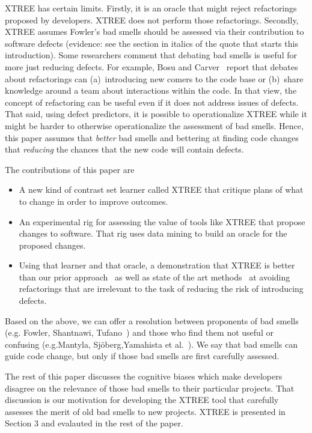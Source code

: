 \documentclass{sig-alternate}
\begin{document}
XTREE   has certain limits. Firstly, it is an oracle that  might reject   refactorings proposed
by developers. XTREE does not perform those refactorings.
Secondly, XTREE assumes   Fowler's bad smells
should be assessed via their contribution to software defects
(evidence: see the section in italics of the quote
that starts this introduction). Some researchers 
 comment that   debating bad smells is  useful for more just reducing defects. For example, Bosu and Carver~\cite{bosu13} report that
debates about refactorings can   (a)~introducing new comers to the code base or (b)~share knowledge around a team
about interactions within the code. In that view, 
the concept of refactoring can be useful
even if it does not address issues of defects. 
That said, using
defect predictors,
it is possible to operationalize XTREE
while it might be harder to otherwise operationalize the assessment of bad smells.
Hence, 
this paper assumes that {\em better} bad smells and
bettering at finding code changes that  {\em reducing} the chances
that the new code will contain defects. 
 
The contributions of this paper are
\begin{itemize}
    
    \item A new kind of contrast set learner called XTREE
    that   critique plans of what to change   in order
    to improve outcomes.
    \item An experimental rig for assessing the value of tools like
    XTREE that propose changes to software. That rig uses data mining
    to build an oracle for the proposed changes.
    \item Using that learner and that oracle,
    a demonstration that XTREE is better than our prior approach~\cite{me12c}
    as well as   state of the art methods~\cite{Shatnawi10,Alves2010,hermans15}
    at avoiding refactorings that are irrelevant to the task of reducing the risk of introducing defects.
    \end{itemize}
    Based on the above, we can offer
    a resolution between proponents of bad smells (e.g. Fowler, Shantnawi, Tufano~\cite{fowler99,Shatnawi10,Tufano2015}) and those who find them not useful or confusing   (e.g.Mantyla, Sj\"oberg,Yamahista et al.~\cite{Sjoberg2013,Mantyla2004,Yamashita2013}). We say
    that bad smells can guide code change, but only if those bad smells are
    first carefully assessed.  



The rest of this paper discusses the cognitive
biases which make developers disagree on the relevance of those bad smells to
their particular projects.  
 That discussion is our motivation for developing the XTREE  tool
that   carefully assesses the merit of old bad smells to new projects.  XTREE is presented in Section 3 and evalauted in the rest of the paper.
\end{document}
